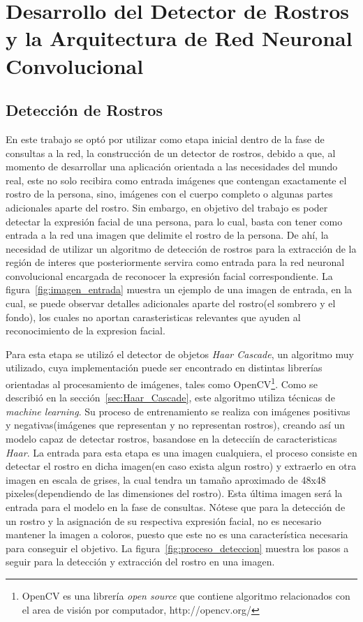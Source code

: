 \chapter{Desarrollo del Detector de Rostros y la Arquitectura de Red Neuronal Convolucional}

\section{Detección de Rostros}
En este trabajo se optó por utilizar como etapa inicial dentro de la fase de consultas a la red, la construcción de un detector de rostros, debido a que, al momento de desarrollar una aplicación orientada a las necesidades del mundo real, este no solo recibira como entrada imágenes que contengan exactamente el rostro de la persona, sino, imágenes con el cuerpo completo o algunas partes adicionales aparte del rostro. Sin embargo, en objetivo del trabajo es poder detectar la expresión facial de una persona, para lo cual, basta con tener como entrada a la red una imagen que delimite el rostro de la persona. De ahí, la necesidad de utilizar un algoritmo de detección de rostros para la extracción de la región de interes que posteriormente servira como entrada para la red neuronal convolucional encargada de reconocer la expresión facial correspondiente. La figura~\ref{fig:imagen_entrada} muestra un ejemplo de una imagen de entrada, en la cual, se puede observar detalles adicionales aparte del rostro(el sombrero y el fondo), los cuales no aportan carasteristicas relevantes que ayuden al reconocimiento de la expresion facial.

Para esta etapa se utilizó el detector de objetos \textit{Haar Cascade}, un algoritmo muy utilizado, cuya implementación puede ser encontrado en distintas librerías orientadas al procesamiento de imágenes, tales como OpenCV\footnote[5]{OpenCV es una librería \textit{open source} que contiene algoritmo relacionados con el area de visión por computador, http://opencv.org/}. Como se describió en la sección~\ref{sec:Haar_Cascade}, este algoritmo utiliza técnicas de \textit{machine learning}. Su proceso de entrenamiento se realiza con imágenes positivas y negativas(imágenes que representan y no representan rostros), creando así un modelo capaz de detectar rostros, basandose en la detecciín de caracteristicas \textit{Haar}. La entrada para esta etapa es una imagen cualquiera, el proceso consiste en detectar el rostro en dicha imagen(en caso exista algun rostro) y extraerlo en otra imagen en escala de grises, la cual tendra un tamaño aproximado de 48x48 pixeles(dependiendo de las dimensiones del rostro). Esta última imagen será la entrada para el modelo en la fase de consultas. Nótese que para la detección de un rostro y la asignación de su respectiva expresión facial, no es necesario mantener la imagen a coloros, puesto que este no es una característica necesaria para conseguir el objetivo. La figura~\ref{fig:proceso_deteccion} muestra los pasos a seguir para la detección y extracción del rostro en una imagen.

